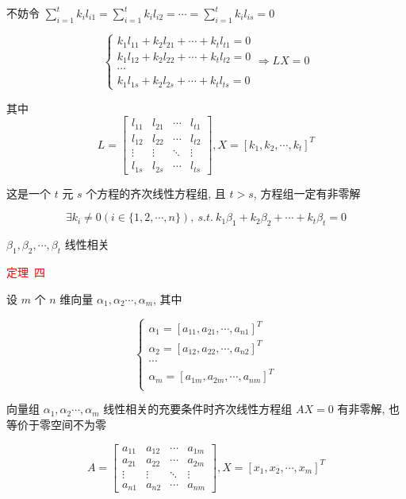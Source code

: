 \begin{theorem}[判别线性相关性的七大定理]
\begin{anymark}[证明]
		不妨令 $\sum\limits_{i=1}^{t}k_{i}l_{i1} = \sum\limits_{i=1}^{t}k_{i}l_{i2} = \cdots = \sum\limits_{i=1}^{t}k_{i}l_{is} = 0$

		$$\begin{cases}
		  k_{1}l_{11} + k_{2}l_{21} + \cdots + k_{t}l_{t1} = 0\\
		  k_{1}l_{12} + k_{2}l_{22} + \cdots + k_{t}l_{t2} = 0\\
		  \cdots\\
		  k_{1}l_{1s} + k_{2}l_{2s} + \cdots + k_{t}l_{ts} = 0
		\end{cases}\Rightarrow 
		LX = 0$$

		其中
		$$L = \begin{bmatrix}
			l_{11} & l_{21} & \cdots & l_{t1}\\
			l_{12} & l_{22} & \cdots & l_{t2}\\
			\vdots & \vdots & \ddots & \vdots\\
			l_{1s} & l_{2s} & \cdots & l_{ts}
		\end{bmatrix}, X = [k_{1},k_{2},\cdots,k_{t}]^{T}$$
		
		这是一个 $t$ 元 $s$ 个方程的齐次线性方程组, 且 $t > s$, 方程组一定有非零解 

		$$\exists k_{i}\neq 0(i\in\{1,2,\cdots,n\}), \ s.t. \ k_{1}\beta_{1}+k_{2}\beta_{2}+\cdots+k_{t}\beta_{t}=0$$
		
		$\beta_{1},\beta_{2},\cdots,\beta_{t}$ 线性相关
	\end{anymark}

	\textcolor{red}{定理\ 四}
	
	设 $m$ 个 $n$ 维向量 $\alpha_{1},\alpha_{2}\cdots,\alpha_{m}$, 其中
	
	$$\begin{cases}
		\alpha_{1}=[a_{11},a_{21},\cdots,a_{n1}]^{T}\\
		\alpha_{2}=[a_{12},a_{22},\cdots,a_{n2}]^{T}\\
		\cdots\\
		\alpha_{m}=[a_{1m},a_{2m},\cdots,a_{nm}]^{T}\\
	\end{cases}$$

	向量组 $\alpha_{1},\alpha_{2}\cdots,\alpha_{m}$ 线性相关的充要条件时齐次线性方程组 $AX = 0$ 有非零解, 也等价于零空间不为零

	$$A = \begin{bmatrix}
		a_{11} & a_{12} & \cdots & a_{1m}\\
		a_{21} & a_{22} & \cdots & a_{2m}\\
		\vdots & \vdots & \ddots & \vdots\\
		a_{n1} & a_{n2} & \cdots & a_{nm}
	\end{bmatrix}, X=[x_{1},x_{2},\cdots,x_{m}]^{T}$$
	

\end{theorem}
